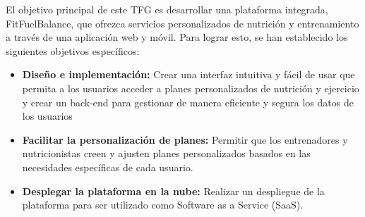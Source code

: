El objetivo principal de este TFG es desarrollar una plataforma integrada, FitFuelBalance, que ofrezca servicios personalizados de nutrición y entrenamiento a través de una aplicación web y móvil. Para lograr esto, se han establecido los siguientes objetivos específicos:

\begin{itemize}
    \item \textbf{Diseño e implementación:} Crear una interfaz intuitiva y fácil de usar que permita a los usuarios acceder a planes personalizados de nutrición y ejercicio y crear un back-end para gestionar de manera eficiente y segura los datos de los usuarios
    \item \textbf{Facilitar la personalización de planes:} Permitir que los entrenadores y nutricionistas creen y ajusten planes personalizados basados en las necesidades específicas de cada usuario.
    \item \textbf{Desplegar la plataforma en la nube:} Realizar un despliegue de la plataforma para ser utilizado como Software as a Service (SaaS).
\end{itemize}
